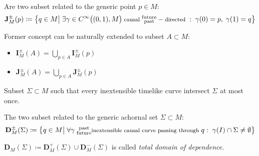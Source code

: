 \documentclass[a4paper,12pt]{scrartcl}    %
\begin{document}
	\begin{definition}
		Are two subset related to the generic point $p	\in M$:
		\begin{displaymath}
			\mathbf{J}_M^\pm(p) \coloneqq \big\{ q \in M \big\vert \; \exists \gamma \in C^\infty\big((0,1), M\big)\; \textrm{\footnotesize causal } \substack{\textrm{future}\\ \textrm{past} } -\textrm{\footnotesize directed }:\; \gamma(0)=p,\; \gamma(1)=q  \big\}
		\end{displaymath}		
	\end{definition}

	\begin{notationfix}
		Former concept can be naturally extended to subset $A \subset M$:
			\begin{itemize}
				\item $\mathbf{I}_M^\pm(A) = \bigcup_{p\in A} \mathbf{I}_M^\pm(p) $
				\item $\mathbf{J}_M^\pm(A) = \bigcup_{p\in A} \mathbf{J}_M^\pm(p) $
			\end{itemize}
	\end{notationfix}

	\begin{definition}
		Subset $\Sigma \subset M$ such that every inextensible timelike curve intersect $\Sigma$ at most once.
	\end{definition}

	\begin{definition}
		The two subset related to the generic achornal set $\Sigma \subset M$:
		\begin{displaymath}		
			\mathbf{D}_M^\pm(\Sigma) \coloneqq \big\{ q \in M \big\vert \; \forall \gamma \substack{\textrm{ past}\\ \textrm{ future} }\textrm{\footnotesize inextensible causal curve passing through }q : \; \gamma(I) \cap \Sigma \neq \emptyset  \big\}
		\end{displaymath}		
	\end{definition}

	\begin{notationfix}
		$\mathbf{D}_M(\Sigma)  \coloneqq \mathbf{D}_M^+(\Sigma) \cup \mathbf{D}_M^-(\Sigma)$ is called \emph{total domain of dependence}.
	\end{notationfix}
\end{document}
